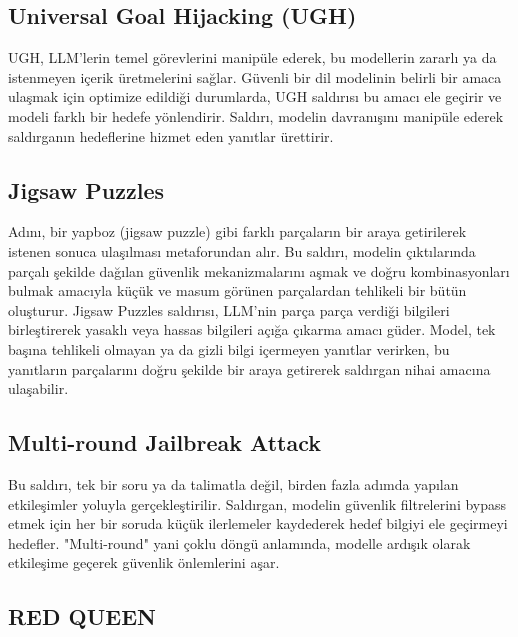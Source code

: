 \newpage

\subsection{Universal Goal Hijacking (UGH)}

UGH, LLM'lerin temel görevlerini manipüle ederek, bu modellerin zararlı ya da istenmeyen içerik üretmelerini sağlar. Güvenli bir dil modelinin belirli bir amaca ulaşmak için optimize edildiği durumlarda, UGH saldırısı bu amacı ele geçirir ve modeli farklı bir hedefe yönlendirir. Saldırı, modelin davranışını manipüle ederek saldırganın hedeflerine hizmet eden yanıtlar ürettirir.

\newpage

\subsection{Jigsaw Puzzles}

Adını, bir yapboz (jigsaw puzzle) gibi farklı parçaların bir araya getirilerek istenen sonuca ulaşılması metaforundan alır. Bu saldırı, modelin çıktılarında parçalı şekilde dağılan güvenlik mekanizmalarını aşmak ve doğru kombinasyonları bulmak amacıyla küçük ve masum görünen parçalardan tehlikeli bir bütün oluşturur. Jigsaw Puzzles saldırısı, LLM'nin parça parça verdiği bilgileri birleştirerek yasaklı veya hassas bilgileri açığa çıkarma amacı güder. Model, tek başına tehlikeli olmayan ya da gizli bilgi içermeyen yanıtlar verirken, bu yanıtların parçalarını doğru şekilde bir araya getirerek saldırgan nihai amacına ulaşabilir.

\newpage

\subsection{Multi-round Jailbreak Attack}

Bu saldırı, tek bir soru ya da talimatla değil, birden fazla adımda yapılan etkileşimler yoluyla gerçekleştirilir. Saldırgan, modelin güvenlik filtrelerini bypass etmek için her bir soruda küçük ilerlemeler kaydederek hedef bilgiyi ele geçirmeyi hedefler. "Multi-round" yani çoklu döngü anlamında, modelle ardışık olarak etkileşime geçerek güvenlik önlemlerini aşar.

\newpage

\subsection{RED QUEEN}

